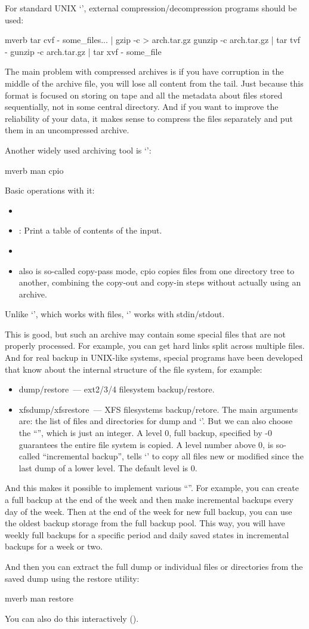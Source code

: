 For standard UNIX `', external compression/decompression programs
should be used:
\begin{code}{mverb}
tar cvf - some_files... | gzip -c > arch.tar.gz
gunzip -c arch.tar.gz | tar tvf -
gunzip -c arch.tar.gz | tar xvf - some_file
\end{code}
The main problem with compressed archives is if you have corruption in
the middle of the archive file, you will lose all content from the tail.
Just because this format is focused on storing on tape and all the metadata
about files stored sequentially, not in some central directory.
And if you want to improve the reliability of your data, it makes sense
to compress the files separately and put them in an uncompressed archive.

Another widely used archiving tool is `':
\begin{code}{mverb}
man cpio
\end{code}
Basic operations with it:
\begin{itemize}
\item {}
\item {}: Print a table of contents of the input.
\item {}
\item also  is so-called copy-pass mode,
      cpio copies files from one directory tree to another, combining
      the copy-out and copy-in steps without actually using an archive.
\end{itemize}
Unlike `', which works with files, `' works with stdin/stdout.

This is good, but such an archive may contain some special files that are not
properly processed. For example, you can get hard links split across multiple
files. And for real backup in UNIX-like systems, special programs have been
developed that know about the internal structure of the file system, for example:
\begin{itemize}
\item dump/restore~--- ext2/3/4 filesystem backup/restore.
\item xfsdump/xfsrestore~--- XFS filesystems backup/retore.
      The main arguments are: the list of files and directories for dump and
      `'. But we can also choose the ``'',
      which is just an integer. A level 0, full backup, specified by -0
      guarantees the entire file system is copied. A level number above 0,
      is so-called ``incremental backup'', tells `' to copy all files
      new or modified since the last dump of a lower level.
      The default level is 0.
\end{itemize}
And this makes it possible to implement various ``''.
For example, you can create a full backup at the end of the week and then
make incremental backups every day of the week. Then at the end of the week
for new full backup, you can use the oldest backup storage from the full backup
pool. This way, you will have weekly full backups for a specific period and
daily saved states in incremental backups for a week or two.

And then you can extract the full dump or individual files or directories
from the saved dump using the restore utility:
\begin{code}{mverb}
man restore
\end{code}
You can also do this interactively ().

